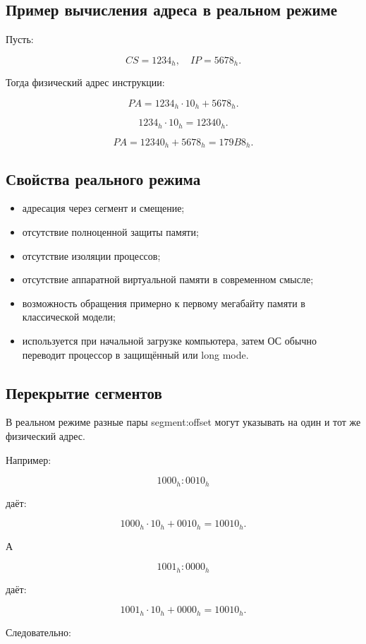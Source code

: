\documentclass[a4paper,12pt]{article}
\begin{document}
\subsection{Пример вычисления адреса в реальном режиме}

Пусть:

\[
CS = 1234_h,\quad IP = 5678_h.
\]

Тогда физический адрес инструкции:

\[
PA = 1234_h \cdot 10_h + 5678_h.
\]

\[
1234_h \cdot 10_h = 12340_h.
\]

\[
PA = 12340_h + 5678_h = 179B8_h.
\]

\subsection{Свойства реального режима}

\begin{itemize}
    \item адресация через сегмент и смещение;
    \item отсутствие полноценной защиты памяти;
    \item отсутствие изоляции процессов;
    \item отсутствие аппаратной виртуальной памяти в современном смысле;
    \item возможность обращения примерно к первому мегабайту памяти в классической модели;
    \item используется при начальной загрузке компьютера, затем ОС обычно переводит процессор в защищённый или long mode.
\end{itemize}

\subsection{Перекрытие сегментов}

В реальном режиме разные пары segment:offset могут указывать на один и тот же физический адрес.

Например:

\[
1000_h:0010_h
\]

даёт:

\[
1000_h \cdot 10_h + 0010_h = 10010_h.
\]

А

\[
1001_h:0000_h
\]

даёт:

\[
1001_h \cdot 10_h + 0000_h = 10010_h.
\]

Следовательно:
\end{document}
